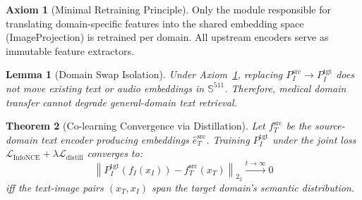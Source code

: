 \documentclass[12pt,a4paper]{article}
\theoremstyle{definition}
\newtheorem{axiom}{Axiom}[section]
\theoremstyle{plain}
\newtheorem{theorem}{Theorem}[section]
\newtheorem{lemma}[theorem]{Lemma}
\theoremstyle{remark}
\newcommand{\Sph}{\mathbb{S}}
\newcommand{\Norm}[1]{\left\|#1\right\|_2}
\begin{document}
\begin{axiom}[Minimal Retraining Principle]
\label{ax:minretrain}
Only the module responsible for translating domain-specific features into the shared embedding space (ImageProjection) is retrained per domain. All upstream encoders serve as immutable feature extractors.
\end{axiom}

\begin{lemma}[Domain Swap Isolation]
Under Axiom~\ref{ax:minretrain}, replacing $P_I^{\text{src}} \to P_I^{\text{tgt}}$ does not move existing text or audio embeddings in $\Sph^{511}$. Therefore, medical domain transfer cannot degrade general-domain text retrieval.
\end{lemma}

\begin{theorem}[Co-learning Convergence via Distillation]
Let $f_T^{\text{src}}$ be the source-domain text encoder producing embeddings $\hat{e}_T^{\text{src}}$. Training $P_I^{\text{tgt}}$ under the joint loss $\mathcal{L}_{\text{InfoNCE}} + \lambda\mathcal{L}_{\text{distill}}$ converges to:
\[
  \Norm{P_I^{\text{tgt}}(f_I(x_I)) - f_T^{\text{src}}(x_T)}_2 \xrightarrow{t \to \infty} 0
\]
iff the text-image pairs $(x_T, x_I)$ span the target domain's semantic distribution.
\end{theorem}
\end{document}
